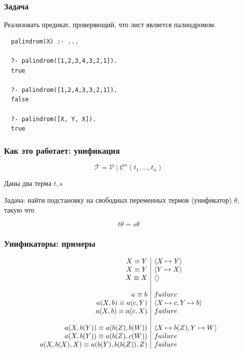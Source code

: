 \documentclass{beamer}
\begin{document}
\begin{frame}[fragile]
  \frametitle{Задача}
Реализовать предикат, проверяющий, что лист является палиндромом.

\begin{verbatim}
  palindrom(X) :- ...

  ?- palindrom([1,2,3,4,3,2,1]).
  true

  ?- palindrom([1,2,4,3,3,2,1]).
  false

  ?- palindrom([X, Y, X]).
  true
\end{verbatim}

\end{frame}

\begin{frame}[fragile]
  \frametitle{Как это работает: унификация}

\[
  \mathcal{T} = \mathcal{V} \mid \mathcal{C}^n (t_1, \dots, t_n)
\]

\begin{center}
  Даны два терма $t, s$
\end{center}

\begin{center}
  Задача: найти подстановку на свободных переменных термов (унификатор) $\theta$, такую что
\end{center}

\[
  t \theta = s \theta
\]

\end{frame}

\begin{frame}[fragile]
  \frametitle{Унификаторы: примеры}
\[
  \begin{array}{r | l}
    X \equiv Y & \langle X \mapsto Y \rangle \\
    X \equiv Y & \langle Y \mapsto X \rangle \\
    X \equiv X & \langle \rangle \\
    & \\
    a \equiv b & failure \\
    a(X, b) \equiv a(c, Y) & \langle X \mapsto c, Y \mapsto b \rangle \\
    a(X, b) \equiv a(c, X) & failure \\
    & \\
    a(X, b(Y)) \equiv a(b(Z), b(W)) & \langle X \mapsto b(Z), Y \mapsto W \rangle \\
    a(X, b(Y)) \equiv a(b(Z), c(W)) & failure \\
    a(X, b(X), X) \equiv a(b(Y), b(b(Z)), Z) & failure
  \end{array}
\]

\end{frame}
\end{document}
